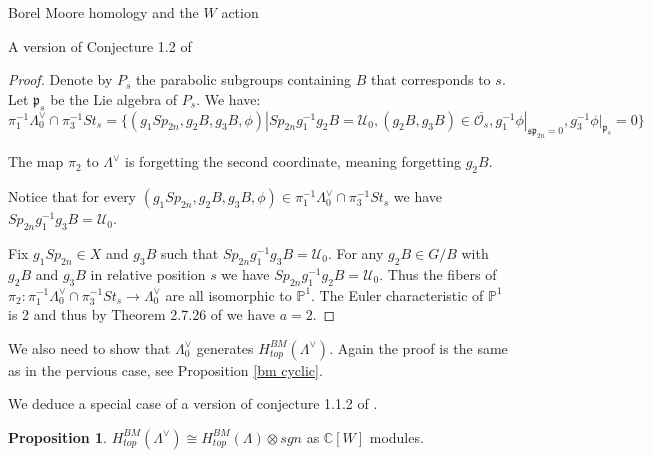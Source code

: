 \documentclass[12pt]{article}
\newcommand{\p}{\mathbb{P}}
\newcommand{\C}{\mathbb{C}}
\newcommand{\s}{\mathcal{O}}
\newcommand{\<}{\langle}
\renewcommand{\>}{\rangle}
\theoremstyle{plain}
\theoremstyle{definition}
\newtheorem{prop}[theorem]{Proposition}
\begin{document}
\begin{section}{Borel Moore homology and the $W$ action}
\begin{subsection}{A version of Conjecture 1.2 of \cite{finkelberg2023lagrangiansubvarietieshypersphericalvarieties}}
\begin{proof}
 Denote by $P_s$ the parabolic subgroups containing $B$ that corresponds to $s$. Let $\mathfrak{p}_s$ be the Lie algebra of $P_s$. We have:
     $$\pi^{-1}_1\Lambda^\vee_0\cap \pi_3^{-1}St_s=\{(g_1Sp_{2n},g_2B,g_3B,\phi)|Sp_{2n}g_1^{-1}g_2B=\mathcal{U}_0,(g_2B,g_3B)\in \overline{\s_s},g_1^{-1}\phi|_{\mathfrak{sp}_{2n}=0},g_3^{-1}\phi|_{\mathfrak{p}_s}=0 \}$$

     The map $\pi_2$ to $\Lambda^\vee$ is forgetting the second coordinate, meaning forgetting $g_2B$. 

     Notice that for every $(g_1Sp_{2n},g_2B,g_3B,\phi)\in \pi^{-1}_1\Lambda^\vee_0\cap \pi_3^{-1}St_s$ we have $Sp_{2n}g_1^{-1}g_3B=\mathcal{U}_0$.
     
     Fix $g_1Sp_{2n}\in X$ and $g_3B$ such that $Sp_{2n}g_1^{-1}g_3B=\mathcal{U}_0$. For any $g_2B\in G/B$ with $g_2B$ and $g_3B$ in relative position $s$ we have $Sp_{2n}g_1^{-1}g_2B=\mathcal{U}_0$. Thus the fibers of $\pi_2:\pi^{-1}_1\Lambda^\vee_0\cap \pi_3^{-1}St_s\rightarrow \Lambda^\vee_0$ are all isomorphic to $\p^1$. The Euler characteristic of $\p^1$ is 2 and thus by Theorem 2.7.26 of \cite{Chriss1997RepresentationTA} we have $a=2$. 
    
\end{proof}

We also need to show that $\Lambda^\vee_0$ generates $H_{top}^{BM}(\Lambda^\vee)$. Again the proof is the same as in the pervious case, see Proposition \ref{bm cyclic}. 

We deduce a special case of a version of conjecture 1.1.2 of \cite{finkelberg2023lagrangiansubvarietieshypersphericalvarieties}.

\begin{prop}
    $H_{top}^{BM}(\Lambda^\vee)\cong H_{top}^{BM}(\Lambda)\otimes sgn$ as $\C[W]$ modules.
\end{prop}

    
\end{subsection}
    
\end{section}
\end{document}
